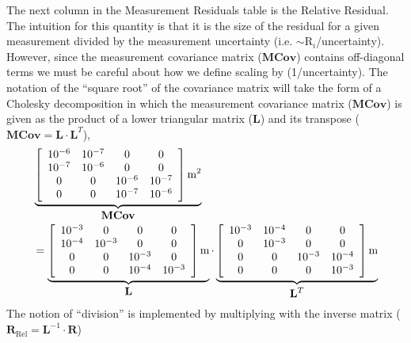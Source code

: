 The next column in the Measurement Residuals table is the Relative Residual.  The intuition for this quantity is that it is the size of the residual for a given measurement divided by the measurement uncertainty (i.e. $\sim\text{R}_i$/uncertainty).  However, since the measurement covariance matrix ($\mathbf{MCov}$) contains off-diagonal terms we must be careful about how we define scaling by (1/uncertainty).  The notation of the ``square root'' of the covariance matrix will take the form of a Cholesky decomposition in which the measurement covariance matrix ($\mathbf{MCov}$) is given as the product of a lower triangular matrix ($\mathbf{L}$) and its transpose ($\mathbf{MCov}=\mathbf{L}\cdot\mathbf{L}^T$),
\begin{equation}
\begin{split}
&\mathop{\underbrace{\left[\begin{array}{cccc}10^{-6}&10^{-7}&0&0\\10^{-7}&10^{-6}&0&0\\0&0&10^{-6}&10^{-7}\\0&0&10^{-7}&10^{-6}\end{array}\right]\text{m}^2}_{\displaystyle{\mathbf{MCov}}}}\\
&=\mathop{\underbrace{\left[\begin{array}{cccc}10^{-3}&0&0&0\\10^{-4}&10^{-3}&0&0\\0&0&10^{-3}&0\\0&0&10^{-4}&10^{-3}\end{array}\right]\text{m}}_{\displaystyle{\mathbf{L}}}}\cdot\mathop{\underbrace{\left[\begin{array}{cccc}10^{-3}&10^{-4}&0&0\\0&10^{-3}&0&0\\0&0&10^{-3}&10^{-4}\\0&0&0&10^{-3}\end{array}\right]\text{m}}_{\displaystyle{\mathbf{L}^T}}}
\end{split}
\end{equation}
The notion of ``division'' is implemented by multiplying with the inverse matrix ($\mathbf{R}_{\text{Rel}}=\mathbf{L}^{-1}\cdot\mathbf{R}$)
